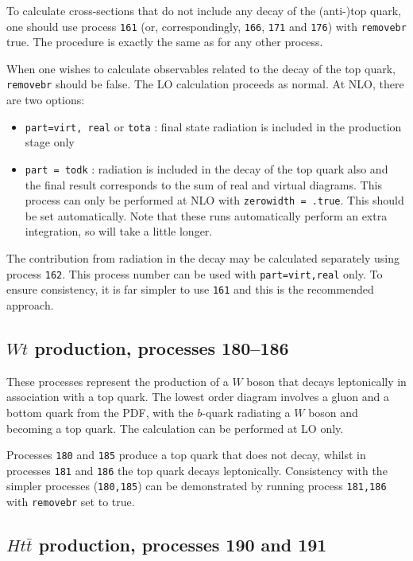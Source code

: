 \documentclass[12pt]{article}
\begin{document}
To calculate cross-sections that do not include any decay of the (anti-)top
quark, one should use process {\tt 161}
(or, correspondingly, {\tt 166}, {\tt 171} and {\tt 176}) with {\tt removebr}
true. The procedure is exactly the same
as for any other process.

When one wishes to calculate observables related to the decay of the top
quark, {\tt removebr} should be false.
The LO calculation proceeds as normal. At NLO, there are two options:
\begin{itemize}
\item {\tt part=virt, real} or {\tt tota} : final state radiation is included
in the production stage only
\item {\tt part = todk} : radiation is included in the decay of the top
quark also and the final result corresponds to the sum of real and virtual
diagrams. This process can only be performed at NLO with 
{\tt zerowidth = .true}. This should be set automatically.
Note that these runs automatically perform an extra integration, so
will take a little longer.
\end{itemize}

The contribution from radiation in the decay may be calculated separately using
process {\tt 162}. This process number can be used with {\tt part=virt,real}
only. To ensure consistency, it is far simpler to use {\tt 161}
and this is the recommended approach.

\subsection{$Wt$ production, processes 180--186}
\label{subsec:wt}

These processes represent the production of a $W$ boson that decays leptonically
in association with a top quark. The lowest order diagram involves a gluon and
a bottom quark from the PDF, with the $b$-quark radiating a $W$ boson and
becoming a top quark. The calculation can be performed at LO only.

Processes {\tt 180} and {\tt 185} produce a top quark that does not decay,
whilst in processes {\tt 181} and {\tt 186} the top quark decays leptonically.
Consistency with
the simpler processes ({\tt 180,185}) can be demonstrated by running process
{\tt 181,186} with {\tt removebr} set to true.

\subsection{$Ht{\bar t}$ production, processes 190 and 191}
\label{subsec:htt}
\end{document}
